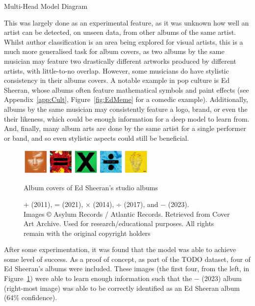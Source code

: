                 \begin{temp}
                    Multi-Head Model Diagram
                \end{temp}
    
                This was largely done as an experimental feature, as it was unknown how well an artist can be detected, on unseen data, from other albums of the same artist. Whilst author classification is an area being explored for visual artists, this is a much more generalised task for album covers, as two albums by the same musician may feature two drastically different artworks produced by different artists, with little-to-no overlap. However, some musicians do have stylistic consistency in their albums covers. A notable example in pop culture is Ed Sheeran, whose albums often feature mathematical symbols and paint effects (see Appendix~\ref{app:Cult}, Figure~\ref{fig:EdMeme} for a comedic example). Additionally, albums by the same musician may consistently feature a logo, brand, or even the their likeness, which could be enough information for a deep model to learn from. And, finally, many album arts are done by the same artist for a single performer or band, and so even stylistic aspects could still be beneficial.
    
                \begin{figure}[h]
                    \centering
                    \includegraphics[width=0.6\textwidth]{images/EdAlbums.png}
                    \caption{Album covers of Ed Sheeran’s studio albums}
                    \label{fig:EdAlbums}
                    \caption*{+ (2011), = (2021), × (2014), ÷ (2017), and − (2023). \\ Images © Asylum Records / Atlantic Records. Retrieved from Cover Art Archive. Used for research/educational purposes. All rights remain with the original copyright holders}
                \end{figure}
    
                After some experimentation, it was found that the model was able to achieve some level of success. As a proof of concept, as part of the TODO dataset, four of Ed Sheeran's albums were included. These images (the first four, from the left, in Figure~\ref{fig:EdAlbums}) were able to learn enough information such that the − (2023) album (right-most image) was able to be correctly identified as an Ed Sheeran album (64\% confidence).
    
